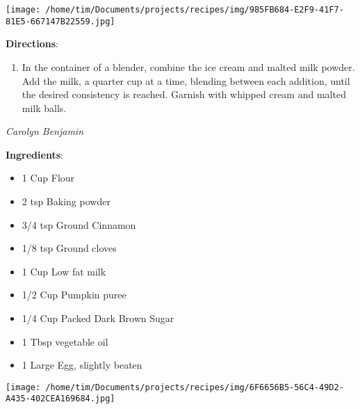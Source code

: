 \documentclass[11pt, twoside, openany]{book}
\begin{document}
\begin{minipage}[t]{0.2\linewidth}
\centering \strut\vspace*{-\baselineskip}\newline
\texttt{[image: /home/tim/Documents/projects/recipes/img/985FB684-E2F9-41F7-81E5-667147B22559.jpg]}\\
\end{minipage}\vspace{3mm}
\textbf{Directions}:
\vspace{-3mm}\begin{enumerate}\setlength\itemsep{-1mm}
\item  In the container of a blender, combine the ice cream and malted milk powder. Add the milk, a quarter cup at a time, blending between each addition, until the desired consistency is reached. Garnish with whipped cream and malted milk balls. 
\end{enumerate}
 \label{pumpkin-waffles}\hfill\textit{Carolyn Benjamin}\\
\begin{minipage}[t]{0.8\linewidth}
\textbf{Ingredients}:\vspace{-3mm}
\begin{multicols}{2}
\begin{itemize}\setlength\itemsep{-1mm}
\item 1 Cup Flour
\item 2 tsp Baking powder
\item 3/4 tsp Ground Cinnamon
\item 1/8 tsp Ground cloves
\item 1 Cup Low fat milk
\item 1/2 Cup Pumpkin puree
\item 1/4 Cup Packed Dark Brown Sugar
\item 1 Tbsp vegetable oil
\item 1 Large Egg, slightly beaten
\end{itemize}
\end{multicols}
\end{minipage}
\begin{minipage}[t]{0.2\linewidth}
\centering \strut\vspace*{-\baselineskip}\newline
\texttt{[image: /home/tim/Documents/projects/recipes/img/6F6656B5-56C4-49D2-A435-402CEA169684.jpg]}\\
\end{minipage}\vspace{3mm}
\end{document}
